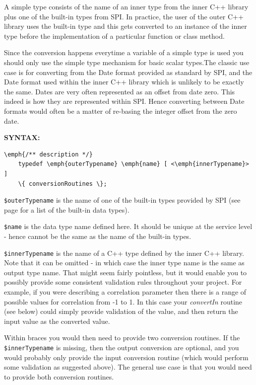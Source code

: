 A simple type consists of the name of an inner type from the inner C++ library plus one of the built-in types from SPI. In practice, the user of the outer C++ library uses the built-in type and this gets converted to an instance of the inner type before the implementation of a particular function or class method.

Since the conversion happens everytime a variable of a simple type is used you should only use the simple type mechanism for basic scalar types.The classic use case is for converting from the Date format provided as standard by SPI, and the Date format used within the inner C++ library which is unlikely to be exactly the same. Dates are very often represented as an offset from date zero. This indeed is how they are represented within SPI. Hence converting between Date formats would often be a matter of re-basing the integer offset from the zero date.

\textbf{SYNTAX:}
\nopagebreak
\begin{Verbatim}[commandchars=\\\{\}]
    \emph{/** description */}
    typedef \emph{outerTypename} \emph{name} [ <\emph{innerTypename}> ]
    \{ conversionRoutines \}; 
\end{Verbatim}

\texttt{\$outerTypename} is the name of one of the built-in types provided by SPI (see page \pageref{dataType} for a list of the built-in data types).

\texttt{\$name} is the data type name defined here.
It should be unique at the service level - hence cannot be the same as the name of the built-in types.

\texttt{\$innerTypename} is the name of a C++ type defined by the inner C++ library.
Note that it can be omitted - in which case the inner type name is the same as output type name.
That might seem fairly pointless, but it would enable you to possibly provide some consistent validation rules throughout your project. For example, if you were describing a correlation parameter then there is a range of possible values for correlation from -1 to 1. In this case your \emph{convertIn} routine (see below) could simply provide validation of the value, and then return the input value as the converted value.

Within braces you would then need to provide two conversion routines. If the \texttt{\$innerTypename} is missing, then the output conversion are optional, and you would probably only provide the input conversion routine (which would perform some validation as suggested above). The general use case is that you would need to provide both conversion routines.

